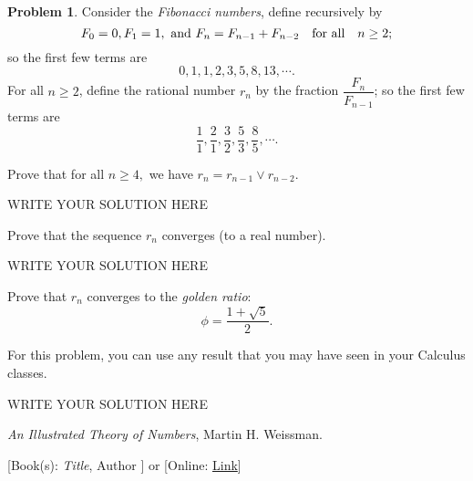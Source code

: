 \documentclass[11pt]{article}
\theoremstyle{plain}
\theoremstyle{definition}
\newtheorem{problem}{Problem}
\theoremstyle{remark}
\numberwithin{equation}{problem}
\begin{document}
\begin{problem}
	Consider the \emph{Fibonacci numbers}, define recursively by
	\[
		F_0 = 0, F_1 = 1, \text{ and } F_n = F_{n-1} + F_{n-2} \quad\text{for all}\quad 
		n\geq 2;
	\]
	so the first few terms are 
	\[
		0,1,1,2,3,5,8,13,\cdots.
	\]
	For all $n\geq 2$, define the rational number $r_n$ by the fraction $\dfrac{F_n}{F_{n-1}}$; so the first few terms are
	\[
		\frac{1}{1}, \frac{2}{1}, \frac{3}{2}, \frac{5}{3}, \frac{8}{5}, \cdots.
	\]
	\begin{listinprob}
		\item Prove that for all $n\geq 4,$ we have $r_n = r_{n-1} \vee r_{n-2}$.
	\end{listinprob}
\begin{solution} %
WRITE YOUR SOLUTION HERE
\end{solution}\clearpage %
	\begin{listinprob}[resume]
		\item Prove that the sequence $r_n$ converges (to a real number).
	\end{listinprob}
\begin{solution} %
WRITE YOUR SOLUTION HERE
\end{solution}\clearpage %
	\begin{listinprob}[resume]
		\item Prove that $r_n$ converges to the \emph{golden ratio}:
		\[
			\phi = \frac{1 + \sqrt{5}}{2}.
		\]
	\end{listinprob}
	For this problem, you can use any result that you may have seen in your Calculus classes.
\begin{solution} %
WRITE YOUR SOLUTION HERE
\end{solution}\clearpage %
\end{problem}


\begin{thebibliography}{9}  %
\emph{An Illustrated Theory of Numbers}, Martin H. Weissman.

[Book(s): \emph{Title}, Author ] or [Online: \href{http://example.com/}{Link}]
\end{thebibliography}  %
\end{document}
